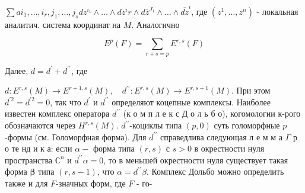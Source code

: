 \documentclass[10pt]{article}
\begin{document}
$\sum a i_{1}, \ldots, i_{r}, j_{1}, \ldots, j_{s} d z^{i_{1}} \wedge \ldots \wedge d z^{i} r \wedge d \bar{z}^{J_{1}} \wedge \ldots \wedge \overline{d z}^{i}$, где $\left(z^{1}, \ldots, z^{n}\right)$ - локальная аналитич. система координат на $M$. Аналогично



\[

E^{p}(F)=\sum_{r+s=p} E^{r, s}(F)

\]



Далее, $d=d^{\prime}+d^{\prime \prime}$, где



$d: E^{r, s}(M) \longrightarrow E^{r+1, s}(M), \quad d^{\prime \prime}: E^{r, s}(M) \longrightarrow E^{r, s+1}(M)$. При этом $d^{\prime 2}=d^{\prime 2}=0$, так что $d^{\prime}$ и $d^{\prime \prime}$ определяют коцепные комплексы. Наиболее известен комплекс оператора $d^{\prime \prime}$ (к о м п л е к с Д о л ь б о), когомологии к-рого обозначаются через $H^{r, s}(M)$. $d^{\prime \prime}$-коциклы типа $(p, 0)$ суть голоморфные $p$-формы (см. Голоморфная форма). Для $d^{\prime \prime}$ справедлива следующая л е м м а $\Gamma$ р о те нд и к а: если $\alpha-$ форма типа $(r, s)$ с $s>0$ в окрестности нуля пространства $\mathbb{C}^{n}$ и $d^{\prime \prime} \alpha=0$, то в меньшей окрестности нуля существует такая форма $\boldsymbol{\beta}$ типа $(r, s-1)$, что $\alpha=d^{\prime \prime} \beta$. Комплекс Дольбо можно определить также и для $F$-значных форм, где $F$ - го-
\end{document}
